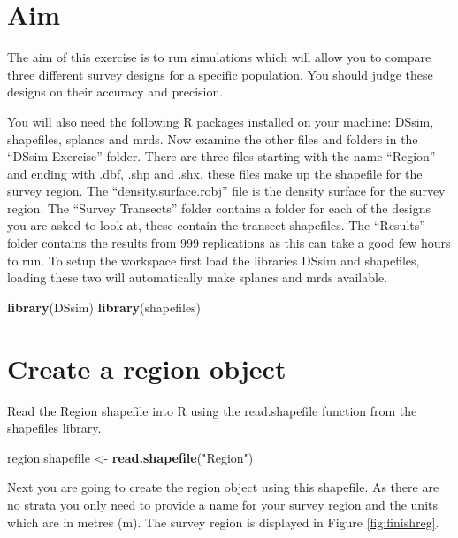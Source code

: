 \documentclass[]{book}
\newenvironment{Shaded}{\begin{snugshade}}{\end{snugshade}}
\newcommand{\KeywordTok}[1]{\textcolor[rgb]{0.13,0.29,0.53}{\textbf{#1}}}
\newcommand{\StringTok}[1]{\textcolor[rgb]{0.31,0.60,0.02}{#1}}
\newcommand{\NormalTok}[1]{#1}
\theoremstyle{definition}
\theoremstyle{definition}
\theoremstyle{remark}
\begin{document}
\section{Aim}\label{aim}

The aim of this exercise is to run simulations which will allow you to
compare three different survey designs for a specific population. You
should judge these designs on their accuracy and precision.

You will also need the following R packages installed on your machine:
DSsim, shapefiles, splancs and mrds. Now examine the other files and
folders in the ``DSsim Exercise'' folder. There are three files starting
with the name ``Region'' and ending with .dbf, .shp and .shx, these
files make up the shapefile for the survey region. The
``density.surface.robj'' file is the density surface for the survey
region. The ``Survey Transects'' folder contains a folder for each of
the designs you are asked to look at, these contain the transect
shapefiles. The ``Results'' folder contains the results from 999
replications as this can take a good few hours to run. To setup the
workspace first load the libraries DSsim and shapefiles, loading these
two will automatically make splancs and mrds available.

\begin{Shaded}
\begin{Highlighting}[]
\KeywordTok{library}\NormalTok{(DSsim)}
\KeywordTok{library}\NormalTok{(shapefiles)}
\end{Highlighting}
\end{Shaded}

\section{Create a region object}\label{create-a-region-object}

Read the Region shapefile into R using the read.shapefile function from
the shapefiles library.

\begin{Shaded}
\begin{Highlighting}[]
\NormalTok{region.shapefile <-}\StringTok{ }\KeywordTok{read.shapefile}\NormalTok{(}\StringTok{"Region"}\NormalTok{)}
\end{Highlighting}
\end{Shaded}

Next you are going to create the region object using this shapefile. As
there are no strata you only need to provide a name for your survey
region and the units which are in metres (m). The survey region is
displayed in Figure \ref{fig:finishreg}.
\end{document}
